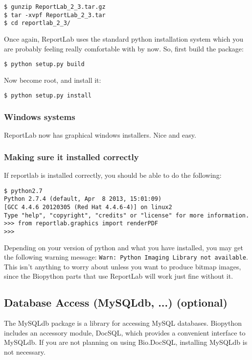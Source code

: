 \documentclass{article}
\begin{document}
\begin{verbatim}
$ gunzip ReportLab_2_3.tar.gz
$ tar -xvpf ReportLab_2_3.tar
$ cd reportlab_2_3/
\end{verbatim}

Once again, ReportLab uses the standard python installation system which
you are probably feeling really comfortable with by now. So, first build
the package:

\begin{verbatim}
$ python setup.py build
\end{verbatim}

Now become root, and install it:

\begin{verbatim}
$ python setup.py install
\end{verbatim}

\subsubsection{Windows systems}

ReportLab now has graphical windows installers.  Nice and easy.

\subsubsection{Making sure it installed correctly}

If reportlab is installed correctly, you should be able to do the
following:

\begin{verbatim}
$ python2.7
Python 2.7.4 (default, Apr  8 2013, 15:01:09) 
[GCC 4.4.6 20120305 (Red Hat 4.4.6-4)] on linux2
Type "help", "copyright", "credits" or "license" for more information.
>>> from reportlab.graphics import renderPDF
>>>
\end{verbatim}

Depending on your version of python and what you have installed, you may
get the following warning message: 
\verb|Warn: Python Imaging Library not available|.  This isn't anything
to worry about unless you want to produce bitmap images, since the
Biopython parts that use ReportLab will work just fine without it.

\subsection{Database Access (MySQLdb, ...) (optional)}

The MySQLdb package is a library for accessing MySQL databases.
Biopython includes an accessory module, DocSQL, which provides a convenient
interface to MySQLdb. 
If you are not planning on using Bio.DocSQL, installing
MySQLdb is not necessary.
\end{document}
